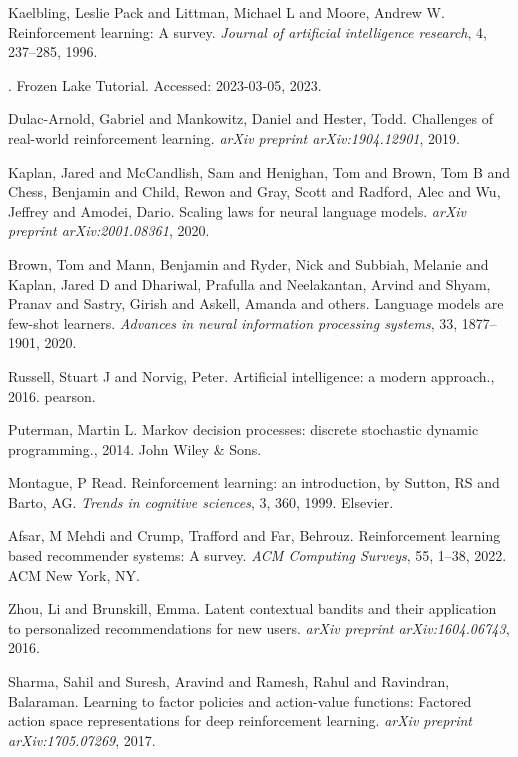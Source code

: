 \begin{thebibliography}{99}
 Kaelbling, Leslie Pack and Littman, Michael L and Moore, Andrew W. {R}einforcement learning: {A} survey. \textit{Journal of artificial intelligence research}, 4, 237--285, 1996.

 . {F}rozen {L}ake {T}utorial. Accessed: 2023-03-05, 2023.

 Dulac-Arnold, Gabriel and Mankowitz, Daniel and Hester, Todd. {C}hallenges of real-world reinforcement learning. \textit{arXiv preprint arXiv:1904.12901}, 2019.

 Kaplan, Jared and McCandlish, Sam and Henighan, Tom and Brown, Tom B and Chess, Benjamin and Child, Rewon and Gray, Scott and Radford, Alec and Wu, Jeffrey and Amodei, Dario. {S}caling laws for neural language models. \textit{arXiv preprint arXiv:2001.08361}, 2020.

 Brown, Tom and Mann, Benjamin and Ryder, Nick and Subbiah, Melanie and Kaplan, Jared D and Dhariwal, Prafulla and Neelakantan, Arvind and Shyam, Pranav and Sastry, Girish and Askell, Amanda and others. {L}anguage models are few-shot learners. \textit{Advances in neural information processing systems}, 33, 1877--1901, 2020.

 Russell, Stuart J and Norvig, Peter. {A}rtificial intelligence: a modern approach., 2016. pearson.

 Puterman, Martin L. {M}arkov decision processes: discrete stochastic dynamic programming., 2014. John Wiley \& Sons.

 Montague, P Read. {R}einforcement learning: an introduction, by {S}utton, {R}S and {B}arto, {A}G. \textit{Trends in cognitive sciences}, 3, 360, 1999. Elsevier.

 Afsar, M Mehdi and Crump, Trafford and Far, Behrouz. {R}einforcement learning based recommender systems: {A} survey. \textit{ACM Computing Surveys}, 55, 1--38, 2022. ACM New York, NY.

 Zhou, Li and Brunskill, Emma. {L}atent contextual bandits and their application to personalized recommendations for new users. \textit{arXiv preprint arXiv:1604.06743}, 2016.

 Sharma, Sahil and Suresh, Aravind and Ramesh, Rahul and Ravindran, Balaraman. {L}earning to factor policies and action-value functions: {F}actored action space representations for deep reinforcement learning. \textit{arXiv preprint arXiv:1705.07269}, 2017.


\end{thebibliography}
